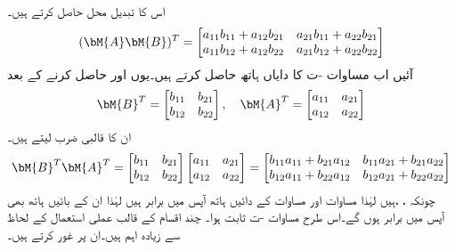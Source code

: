  اس کا تبدیل محل حاصل کرتے ہیں۔
\begin{align}\label{مساوات_الجبرا_تبدیل_محل_بائیں_ہاتھ}
(\bM{A}\bM{B})^T=\begin{bmatrix}a_{11}b_{11}+a_{12}b_{21} &a_{21}b_{11}+a_{22}b_{21} \\a_{11}b_{12}+a_{12}b_{22} & a_{21}b_{12}+a_{22}b_{22} \end{bmatrix}
\end{align}
آئیں اب مساوات -ت کا دایاں ہاتھ حاصل کرتے ہیں۔یوں  اور  حاصل کرنے کے بعد
\begin{align*}
\bM{B}^T=\begin{bmatrix} b_{11}& b_{21}\\ b_{12}& b_{22} \end{bmatrix}, \quad \bM{A}^T=\begin{bmatrix}a_{11}& a_{21}\\ a_{12}&a_{22}  \end{bmatrix}
\end{align*}
ان کا قالبی ضرب لیتے ہیں۔
\begin{align}\label{مساوات_الجبرا_تبدیل_محل_دائیں_ہاتھ}
\bM{B}^T\bM{A}^T=\begin{bmatrix} b_{11}& b_{21}\\ b_{12}& b_{22} \end{bmatrix}\begin{bmatrix}a_{11}& a_{21}\\ a_{12}&a_{22}  \end{bmatrix}=\begin{bmatrix}b_{11}a_{11}+b_{21}a_{12} &b_{11}a_{21}+b_{21}a_{22} \\b_{12}a_{11}+b_{22}a_{12} &b_{12} a_{21}+b_{22}a_{22} \end{bmatrix}
\end{align}
چونکہ ، ، ہیں لہٰذا مساوات  اور مساوات  کے دائیں ہاتھ آپس میں برابر ہیں لہٰذا ان کے بائیں ہاتھ بھی آپس میں برابر ہوں گے۔اس طرح  مساوات -ت ثابت ہوا۔
چند اقسام  کے قالب عملی استعمال کے لحاظ سے زیادہ اہم ہیں۔ان پر غور کرتے ہیں۔

